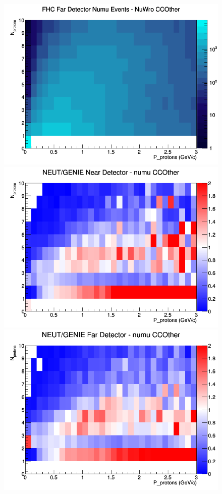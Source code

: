 \begin{figure}[h]
\endminipage
{}
\includegraphics[width=\linewidth]{N_P/nominal/protons/CCOther_FHC_FD_numu_N_P_NuWro.png}
\endminipage
\newline
{}
\includegraphics[width=\linewidth]{N_P/nominal/protons/ratios/CCOther_NEUT_GENIE_numu_near_N_P.png}
\endminipage
{}
\includegraphics[width=\linewidth]{N_P/nominal/protons/ratios/CCOther_NEUT_GENIE_numu_far_N_P.png}

\end{figure}
